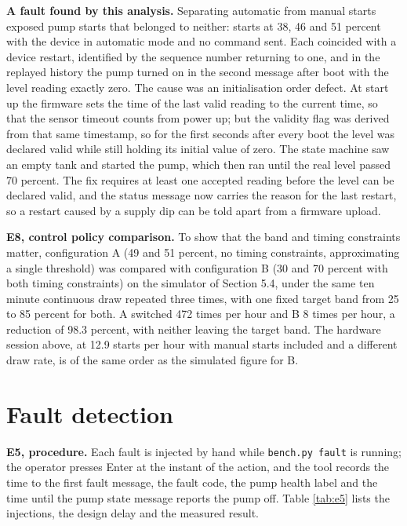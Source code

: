 \textbf{A fault found by this analysis.} Separating automatic from manual starts exposed pump starts that belonged to neither: starts at 38, 46 and 51 percent with the device in automatic mode and no command sent. Each coincided with a device restart, identified by the sequence number returning to one, and in the replayed history the pump turned on in the second message after boot with the level reading exactly zero. The cause was an initialisation order defect. At start up the firmware sets the time of the last valid reading to the current time, so that the sensor timeout counts from power up; but the validity flag was derived from that same timestamp, so for the first seconds after every boot the level was declared valid while still holding its initial value of zero. The state machine saw an empty tank and started the pump, which then ran until the real level passed 70 percent. The fix requires at least one accepted reading before the level can be declared valid, and the status message now carries the reason for the last restart, so a restart caused by a supply dip can be told apart from a firmware upload.

\textbf{E8, control policy comparison.} To show that the band and timing constraints matter, configuration A (49 and 51 percent, no timing constraints, approximating a single threshold) was compared with configuration B (30 and 70 percent with both timing constraints) on the simulator of Section 5.4, under the same ten minute continuous draw repeated three times, with one fixed target band from 25 to 85 percent for both. A switched 472 times per hour and B 8 times per hour, a reduction of 98.3 percent, with neither leaving the target band. The hardware session above, at 12.9 starts per hour with manual starts included and a different draw rate, is of the same order as the simulated figure for B.

\section{Fault detection}

\textbf{E5, procedure.} Each fault is injected by hand while \texttt{bench.py fault} is running; the operator presses Enter at the instant of the action, and the tool records the time to the first fault message, the fault code, the pump health label and the time until the pump state message reports the pump off. Table \ref{tab:e5} lists the injections, the design delay and the measured result.

